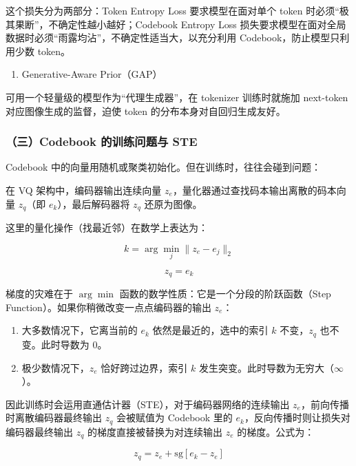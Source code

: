 这个损失分为两部分：Token Entropy Loss 要求模型在面对单个 token 时必须``极其果断''，不确定性越小越好；Codebook Entropy Loss 损失要求模型在面对全局数据时必须``雨露均沾''，不确定性适当大，以充分利用 Codebook，防止模型只利用少数 token。

\begin{enumerate}
\def\labelenumi{\arabic{enumi}.}
\setcounter{enumi}{2}
\tightlist
\item
  Generative-Aware Prior（GAP）
\end{enumerate}

可用一个轻量级的模型作为``代理生成器''，在 tokenizer 训练时就施加 next-token 对应图像生成的监督，迫使 token 的分布本身对自回归生成友好。

\hypertarget{ux4e09codebook-ux7684ux8badux7ec3ux95eeux9898ux4e0e-ste}{%
\subsubsection{（三）Codebook 的训练问题与 STE}\label{ux4e09codebook-ux7684ux8badux7ec3ux95eeux9898ux4e0e-ste}}

Codebook 中的向量用随机或聚类初始化。但在训练时，往往会碰到问题：

在 VQ 架构中，编码器输出连续向量 \(z_e\)，量化器通过查找码本输出离散的码本向量 \(z_q\)（即 \(e_k\)），最后解码器将 \(z_q\) 还原为图像。

这里的量化操作（找最近邻）在数学上表达为：

\[
k=\arg\min_j\lVert z_e-e_j\rVert_2
\]

\[
z_q=e_k
\]

梯度的灾难在于 \(\arg\min\) 函数的数学性质：它是一个分段的阶跃函数（Step Function）。如果你稍微改变一点点编码器的输出 \(z_e\)：

\begin{enumerate}
\def\labelenumi{\arabic{enumi}.}
\tightlist
\item
  大多数情况下，它离当前的 \(e_k\) 依然是最近的，选中的索引 \(k\) 不变，\(z_q\) 也不变。此时导数为 0。
\item
  极少数情况下，\(z_e\) 恰好跨过边界，索引 \(k\) 发生突变。此时导数为无穷大（\(\infty\)）。
\end{enumerate}

因此训练时会运用直通估计器（STE），对于编码器网络的连续输出 \(z_e\)，前向传播时离散编码器最终输出 \(z_q\) 会被赋值为 Codebook 里的 \(e_k\)，反向传播时则让损失对编码器最终输出 \(z_q\) 的梯度直接被替换为对连续输出 \(z_e\) 的梯度。公式为：

\[
z_q=z_e+\mathrm{sg}[e_k-z_e]
\]

